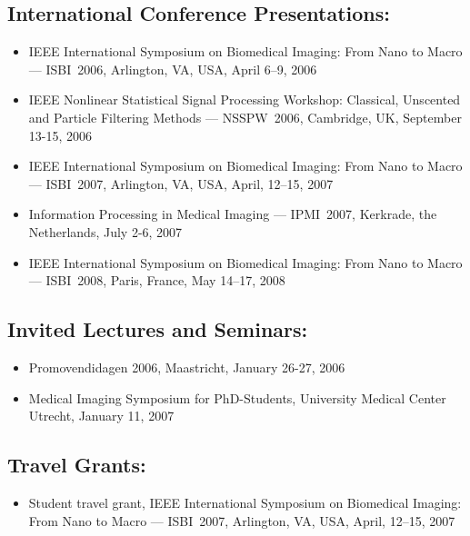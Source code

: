 \subsection*{International Conference Presentations:}
\vspace{1ex}
\begin{itemize}
\item IEEE International Symposium on Biomedical Imaging: From Nano to Macro --- ISBI~2006,
Arlington, VA, USA, April 6--9, 2006
\item IEEE Nonlinear Statistical Signal Processing Workshop: Classical,
    Unscented and Particle Filtering Methods --- NSSPW~2006, Cambridge, UK, September 13-15, 2006
\item IEEE International Symposium on Biomedical Imaging: From Nano to
  Macro --- ISBI~2007, Arlington, VA, USA, April, 12--15, 2007
\item Information Processing in Medical Imaging --- IPMI~2007, Kerkrade, the Netherlands, July 2-6,
2007
\item IEEE International Symposium on Biomedical Imaging: From Nano to
  Macro --- ISBI~2008, Paris, France, May 14--17, 2008
\end{itemize}

\subsection*{Invited Lectures and Seminars:}
\vspace{1ex}
\begin{itemize}
\item Promovendidagen 2006, Maastricht, January 26-27, 2006
\item Medical Imaging Symposium for PhD-Students, University Medical Center Utrecht, January 11, 2007
\end{itemize}

\subsection*{Travel Grants:}
\vspace{1ex}
\begin{itemize}
\item Student travel grant, IEEE International Symposium on Biomedical Imaging: From Nano to
  Macro --- ISBI~2007, Arlington, VA, USA, April, 12--15, 2007
\end{itemize}

